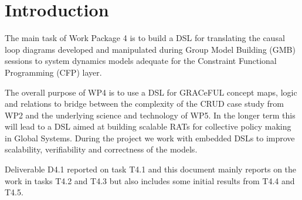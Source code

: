 \section{Introduction}\label{introduction}

The main task of Work Package 4 is to build a DSL for translating the
causal loop diagrams
developed and manipulated during Group Model
Building (GMB) sessions to system dynamics models adequate for the
Constraint Functional Programming (CFP) layer.

The overall purpose of WP4 is to use a DSL for GRACeFUL concept maps,
logic and relations to bridge between the complexity of the CRUD case
study from WP2 and the underlying science and technology of WP5.  In
the longer term this will lead to a DSL aimed at building scalable
RATs for collective policy making in Global Systems.  During the
project we work with embedded DSLs to improve scalability,
verifiability and correctness of the models.

Deliverable D4.1 reported on task T4.1 and this document mainly
reports on the work in tasks T4.2 and T4.3 but also includes some
initial results from T4.4 and T4.5.


